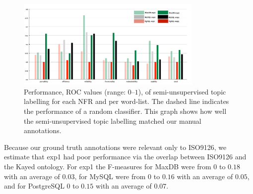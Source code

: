 \documentclass[smallextended]{svjour3}       %
\begin{document}



\begin{figure}[t]
  \centering
 \includegraphics[width=0.8\textwidth]{figures/unsupervised-bar}
 \caption{Performance, ROC values (range: $0$--$1$), of semi-unsupervised topic labelling for
   each NFR and per word-list. The dashed line indicates the performance of a random classifier. This graph shows how well the
   semi-unsupervised topic labelling matched our manual annotations.}


  \label{fig:maxdb-unsup-results}
\end{figure}


Because our ground truth annotations were relevant only to ISO9126,
we estimate that \textsf{exp1} had poor
performance via the overlap between ISO9126 and the Kayed ontology.
For \textsf{exp1} the F-measures for MaxDB were from $0$ to $0.18$ with an average
of $0.03$, for MySQL were from $0$ to $0.16$ with an average of
$0.05$, and for PostgreSQL $0$ to $0.15$ with an average of $0.07$. 


\end{document}
